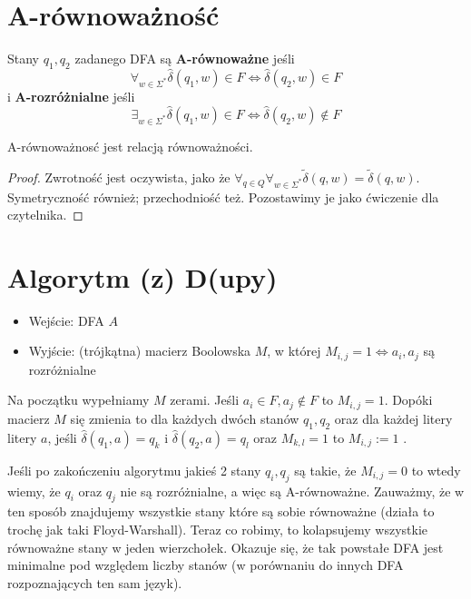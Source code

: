 \section{A-równoważność}

\begin{definition}
    Stany \( q_1, q_2 \) zadanego DFA są \textbf{A-równoważne} jeśli
    \[
        \forall_{w \in \Sigma^*} \hat \delta(q_1, w) \in F \iff \hat \delta(q_2, w) \in F
    \]
    i \textbf{A-rozróżnialne} jeśli
    \[
        \exists_{w \in \Sigma^*} \hat \delta(q_1, w) \in F \iff \hat \delta(q_2, w) \notin F
    \]
\end{definition}

\begin{lemma}
    A-równoważnosć jest relacją równoważności.
\end{lemma}
\begin{proof}
    Zwrotność jest oczywista, jako że \( \forall_{q\in Q} \forall_{w \in \Sigma^*} \tilde\delta(q, w) = \tilde\delta(q,w) \). Symetryczność również; przechodniość też. Pozostawimy je jako ćwiczenie dla czytelnika. 
\end{proof}

\section{Algorytm (z) D(upy)} 

\begin{itemize}
    \item Wejście: DFA \( A \)
    \item Wyjście: (trójkątna) macierz Boolowska \( M \), w której \( M_{i, j} = 1 \iff a_i, a_j \) są rozróżnialne
\end{itemize}

Na początku wypełniamy \( M \) zerami.
Jeśli \( a_i \in F, a_j \notin F \) to \( M_{i, j} = 1 \). 
Dopóki macierz \( M \) się zmienia to dla każdych dwóch stanów \( q_1, q_2 \) oraz dla każdej litery litery \( a \), jeśli \( \hat \delta(q_1, a) = q_k\) i \( \hat \delta(q_2, a) = q_l \) oraz \( M_{k, l} = 1 \) to \( M_{i, j} := 1 \) .

Jeśli po zakończeniu algorytmu jakieś 2 stany \(q_i, q_j\) są takie, że \(M_{i,j} = 0\) to wtedy wiemy, że \(q_i\) oraz \(q_j\) nie są rozróżnialne, a więc są A-równoważne. Zauważmy, że w ten sposób znajdujemy wszystkie stany które są sobie równoważne (działa to trochę jak taki Floyd-Warshall). Teraz co robimy, to kolapsujemy wszystkie równoważne stany w jeden wierzchołek. Okazuje się, że tak powstałe DFA jest minimalne pod względem liczby stanów (w porównaniu do innych DFA rozpoznających ten sam język). 

